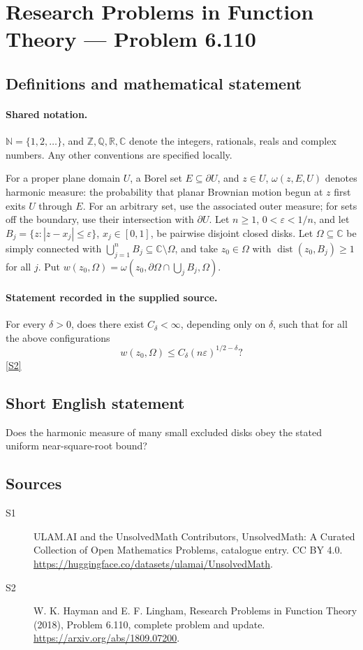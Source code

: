 \documentclass[11pt]{article}
\newcommand{\sref}[2]{\hyperlink{source:#1:#2}{[S#2]}}
\begin{document}
\section{Research Problems in Function Theory — Problem 6.110}\label{statement}

\subsection{Definitions and mathematical statement}

\paragraph{Shared notation.}$\mathbb N=\{1,2,\ldots\}$, and $\mathbb Z,\mathbb Q,\mathbb R,\mathbb C$ denote the integers, rationals, reals and complex numbers. Any other conventions are specified locally.


For a proper plane domain $U$, a Borel set $E\subseteq\partial U$, and $z\in U$, $\omega(z,E,U)$ denotes harmonic measure: the probability that planar Brownian motion begun at $z$ first exits $U$ through $E$. For an arbitrary set, use the associated outer measure; for sets off the boundary, use their intersection with $\partial U$.
Let $n\geq1$, $0<\varepsilon<1/n$, and let $B_j=\{z:|z-x_j|\leq\varepsilon\}$, $x_j\in[0,1]$, be pairwise disjoint closed disks. Let $\Omega\subseteq\mathbb C$ be simply connected with $\bigcup_{j=1}^nB_j\subseteq\mathbb C\setminus\Omega$, and take $z_0\in\Omega$ with $\operatorname{dist}(z_0,B_j)\geq1$ for all $j$. Put $w(z_0,\Omega)=\omega(z_0,\partial\Omega\cap\bigcup_j B_j,\Omega)$.
\paragraph{Statement recorded in the supplied source.}
For every $\delta>0$, does there exist $C_\delta<\infty$, depending only on $\delta$, such that for all the above configurations
\[w(z_0,\Omega)\leq C_\delta(n\varepsilon)^{1/2-\delta}?\] \sref{statement}{2}
\subsection{Short English statement}
Does the harmonic measure of many small excluded disks obey the stated uniform near-square-root bound?
\subsection{Sources}
\begin{description}
\item[\hypertarget{source:statement:1}{S1}] ULAM.AI and the UnsolvedMath Contributors, UnsolvedMath: A Curated Collection of Open Mathematics Problems, catalogue entry. CC BY 4.0. \url{https://huggingface.co/datasets/ulamai/UnsolvedMath}.
\item[\hypertarget{source:statement:2}{S2}] W. K. Hayman and E. F. Lingham, Research Problems in Function Theory (2018), Problem 6.110, complete problem and update. \url{https://arxiv.org/abs/1809.07200}.
\end{description}
\label{end:statement}
\end{document}
